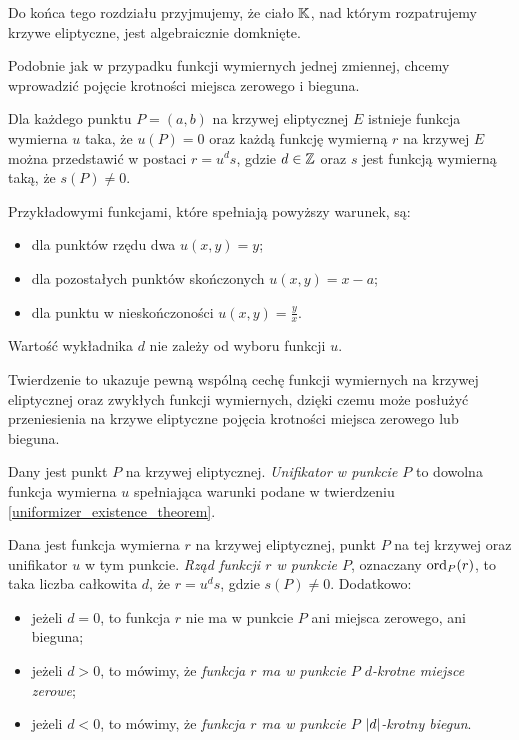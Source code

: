 \begin{remark}
Do końca tego rozdziału przyjmujemy,
że ciało $\mathbb{K}$, nad którym rozpatrujemy krzywe eliptyczne,
jest algebraicznie domknięte.
\end{remark}

Podobnie jak w przypadku funkcji wymiernych jednej zmiennej,
chcemy wprowadzić pojęcie krotności miejsca zerowego i bieguna.

\begin{theorem}\label{uniformizer_existence_theorem}
Dla każdego punktu $P = (a, b)$ na krzywej eliptycznej $E$
istnieje funkcja wymierna $u$ taka, że $u(P) = 0$
oraz każdą funkcję wymierną $r$ na krzywej $E$
można przedstawić w postaci $r = u^ds$,
gdzie $d \in \mathbb{Z}$ oraz $s$ jest funkcją wymierną taką, że $s(P) \neq 0$.

Przykładowymi funkcjami, które spełniają powyższy warunek, są:
\begin{itemize}
\item dla punktów rzędu dwa $u(x, y) = y$;
\item dla pozostałych punktów skończonych $u(x, y) = x - a$;
\item dla punktu w nieskończoności $u(x, y) = \frac{y}{x}$.
\end{itemize}

Wartość wykładnika $d$ nie zależy od wyboru funkcji $u$.
\end{theorem}

Twierdzenie to ukazuje pewną wspólną cechę
funkcji wymiernych na krzywej eliptycznej
oraz zwykłych funkcji wymiernych,
dzięki czemu może posłużyć przeniesienia na krzywe eliptyczne
pojęcia krotności miejsca zerowego lub bieguna.

\begin{definition}
Dany jest punkt $P$ na krzywej eliptycznej.
\emph{Unifikator w punkcie $P$}
to dowolna funkcja wymierna $u$
spełniająca warunki podane w twierdzeniu \ref{uniformizer_existence_theorem}.
\end{definition}

\begin{definition}
Dana jest funkcja wymierna $r$ na krzywej eliptycznej,
punkt $P$ na tej krzywej oraz unifikator $u$ w tym punkcie.
\emph{Rząd funkcji $r$ w punkcie $P$},
oznaczany $\operatorname{ord}_P(r)$,
to taka liczba całkowita $d$,
że $r = u^ds$, gdzie $s(P) \neq 0$.
Dodatkowo:
\begin{itemize}
\item jeżeli $d = 0$,
to funkcja $r$ nie ma w punkcie $P$ ani miejsca zerowego, ani bieguna;
\item jeżeli $d > 0$, to mówimy,
że \emph{funkcja $r$ ma w punkcie $P$ $d$-krotne miejsce zerowe};
\item jeżeli $d < 0$, to mówimy,
że \emph{funkcja $r$ ma w punkcie $P$ $\lvert d\rvert$-krotny biegun}.
\end{itemize}
\end{definition}

